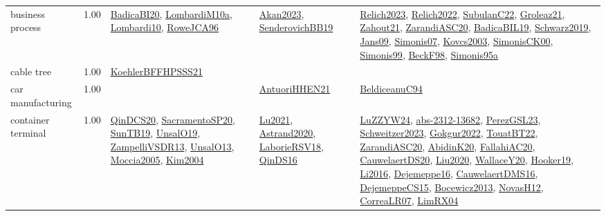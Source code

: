 {\begin{longtable}{p{3cm}r>{\raggedright\arraybackslash}p{6cm}>{\raggedright\arraybackslash}p{6cm}>{\raggedright\arraybackslash}p{8cm}}
\index{business process}\index{ApplicationAreas!business process}business process &  1.00 & \hyperref[detail:BadicaBI20]{BadicaBI20}, \hyperref[detail:LombardiM10a]{LombardiM10a}, \hyperref[detail:Lombardi10]{Lombardi10}, \hyperref[detail:RoweJCA96]{RoweJCA96} & \hyperref[detail:Akan2023]{Akan2023}, \hyperref[detail:SenderovichBB19]{SenderovichBB19} & \hyperref[detail:Relich2023]{Relich2023}, \hyperref[detail:Relich2022]{Relich2022}, \hyperref[detail:SubulanC22]{SubulanC22}, \hyperref[detail:Groleaz21]{Groleaz21}, \hyperref[detail:Zahout21]{Zahout21}, \hyperref[detail:ZarandiASC20]{ZarandiASC20}, \hyperref[detail:BadicaBIL19]{BadicaBIL19}, \hyperref[detail:Schwarz2019]{Schwarz2019}, \hyperref[detail:Jans09]{Jans09}, \hyperref[detail:Simonis07]{Simonis07}, \hyperref[detail:Kovcs2003]{Kovcs2003}, \hyperref[detail:SimonisCK00]{SimonisCK00}, \hyperref[detail:Simonis99]{Simonis99}, \hyperref[detail:BeckF98]{BeckF98}, \hyperref[detail:Simonis95a]{Simonis95a}\\
\index{cable tree}\index{ApplicationAreas!cable tree}cable tree &  1.00 & \hyperref[detail:KoehlerBFFHPSSS21]{KoehlerBFFHPSSS21} &  & \\
\index{car manufacturing}\index{ApplicationAreas!car manufacturing}car manufacturing &  1.00 &  & \hyperref[detail:AntuoriHHEN21]{AntuoriHHEN21} & \hyperref[detail:BeldiceanuC94]{BeldiceanuC94}\\
\index{container terminal}\index{ApplicationAreas!container terminal}container terminal &  1.00 & \hyperref[detail:QinDCS20]{QinDCS20}, \hyperref[detail:SacramentoSP20]{SacramentoSP20}, \hyperref[detail:SunTB19]{SunTB19}, \hyperref[detail:UnsalO19]{UnsalO19}, \hyperref[detail:ZampelliVSDR13]{ZampelliVSDR13}, \hyperref[detail:UnsalO13]{UnsalO13}, \hyperref[detail:Moccia2005]{Moccia2005}, \hyperref[detail:Kim2004]{Kim2004} & \hyperref[detail:Lu2021]{Lu2021}, \hyperref[detail:Astrand2020]{Astrand2020}, \hyperref[detail:LaborieRSV18]{LaborieRSV18}, \hyperref[detail:QinDS16]{QinDS16} & \hyperref[detail:LuZZYW24]{LuZZYW24}, \hyperref[detail:abs-2312-13682]{abs-2312-13682}, \hyperref[detail:PerezGSL23]{PerezGSL23}, \hyperref[detail:Schweitzer2023]{Schweitzer2023}, \hyperref[detail:Gokgur2022]{Gokgur2022}, \hyperref[detail:TouatBT22]{TouatBT22}, \hyperref[detail:ZarandiASC20]{ZarandiASC20}, \hyperref[detail:AbidinK20]{AbidinK20}, \hyperref[detail:FallahiAC20]{FallahiAC20}, \hyperref[detail:CauwelaertDS20]{CauwelaertDS20}, \hyperref[detail:Liu2020]{Liu2020}, \hyperref[detail:WallaceY20]{WallaceY20}, \hyperref[detail:Hooker19]{Hooker19}, \hyperref[detail:Li2016]{Li2016}, \hyperref[detail:Dejemeppe16]{Dejemeppe16}, \hyperref[detail:CauwelaertDMS16]{CauwelaertDMS16}, \hyperref[detail:DejemeppeCS15]{DejemeppeCS15}, \hyperref[detail:Bocewicz2013]{Bocewicz2013}, \hyperref[detail:NovasH12]{NovasH12}, \hyperref[detail:CorreaLR07]{CorreaLR07}, \hyperref[detail:LimRX04]{LimRX04}\\

\end{longtable}}

